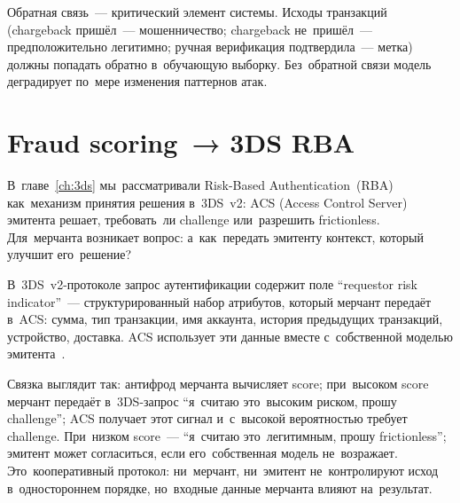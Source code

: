 
Обратная связь~--- критический элемент системы. Исходы транзакций
(chargeback пришёл~--- мошенничество; chargeback не~пришёл~---
предположительно легитимно; ручная верификация подтвердила~--- метка)
должны попадать обратно в~обучающую выборку. Без~обратной связи модель
деградирует по~мере изменения паттернов атак.


\section{Fraud scoring~→ 3DS RBA}
\label{sec:fraud-3ds-rba}

В~главе~\ref{ch:3ds} мы~рассматривали Risk-Based Authentication~(RBA)
как~механизм принятия решения в~3DS~v2: ACS (Access Control Server)
эмитента решает, требовать~ли challenge или~разрешить frictionless.
Для~мерчанта возникает вопрос: а~как~передать эмитенту контекст,
который улучшит его~решение?

В~3DS~v2-протоколе запрос аутентификации содержит поле \enquote{requestor
  risk indicator}~--- структурированный набор атрибутов, который мерчант
передаёт в~ACS: сумма, тип транзакции, имя аккаунта, история предыдущих
транзакций, устройство, доставка. ACS использует эти данные вместе
с~собственной моделью эмитента~.

Связка выглядит так: антифрод мерчанта вычисляет score; при~высоком
score мерчант передаёт в~3DS-запрос \enquote{я~считаю это~высоким
  риском, прошу challenge}; ACS получает этот сигнал и~с~высокой вероятностью
требует challenge. При~низком score~--- \enquote{я~считаю это~легитимным,
  прошу frictionless}; эмитент может согласиться, если его~собственная
модель не~возражает. Это~кооперативный протокол: ни~мерчант, ни~эмитент
не~контролируют исход в~одностороннем порядке, но~входные данные мерчанта
влияют на~результат.

